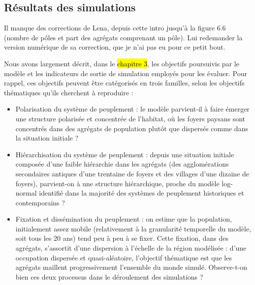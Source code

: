 \clearpage
\subsection{Résultats des simulations}

\begin{tcolorbox}[breakable,left=0pt,right=0pt,top=0pt,bottom=0pt,
	colback=yellow!50,colframe=black,width=\dimexpr\textwidth\relax, 
	enlarge left by=0mm, boxsep=5pt,arc=0pt,outer arc=0pt]
Il manque des corrections de Lena, depuis cette intro jusqu'à la figure 6.6 (nombre de pôles et part des agrégats comprenant un pôle).
Lui redemander la version numérique de sa correction, que je n'ai pas eu pour ce petit bout.
\end{tcolorbox}



Nous avons largement décrit, dans le \hl{chapitre 3}, les objectifs poursuivis par le modèle et les indicateurs de sortie de simulation employés pour les évaluer.
Pour rappel, ces objectifs peuvent être catégorisés en trois familles, selon les objectifs thématiques qu'ils cherchent à reproduire : 
\begin{itemize}
	\item Polarisation du système de peuplement : le modèle parvient-il à faire émerger une structure polarisée et concentrée de l'habitat, où les foyers paysans sont concentrés dans des agrégats de population plutôt que dispersés comme dans la situation initiale ?
	\item Hiérarchisation du système de peuplement : depuis une situation initiale composée d'une faible hiérarchie dans les agrégats (des \og agglomérations secondaires antiques\fg{} d'une trentaine de foyers et des \og villages\fg{} d'une dizaine de foyers), parvient-on à une structure hiérarchique, proche du modèle log-normal identifié dans la majorité des systèmes de peuplement historiques et contemporains ?
	\item Fixation et dissémination du peuplement : on estime que la population, initialement assez mobile (relativement à la granularité temporelle du modèle, soit tous les 20 ans) tend peu à peu à se fixer.
	Cette fixation, dans des agrégats, s'assortit d'une dispersion à l'échelle de la région modélisée : d'une occupation dispersée et quasi-aléatoire, l'objectif thématique est que les agrégats maillent progressivement l'ensemble du monde simulé.
	Observe-t-on bien ces deux processus dans le déroulement des simulations ?
\end{itemize}

